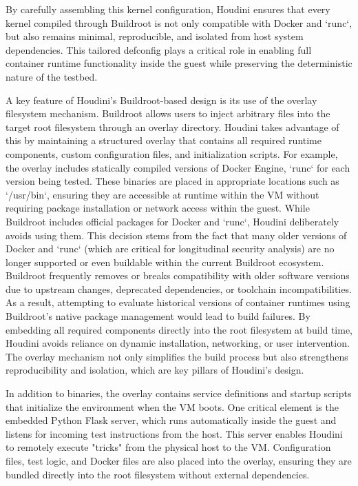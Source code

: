 \begin{doublespace}
By carefully assembling this kernel configuration, Houdini ensures that every kernel compiled through Buildroot is not only compatible with Docker and `runc`, but also remains minimal, reproducible, and isolated from host system dependencies. This tailored defconfig plays a critical role in enabling full container runtime functionality inside the guest while preserving the deterministic nature of the testbed.

A key feature of Houdini's Buildroot-based design is its use of the overlay filesystem mechanism. Buildroot allows users to inject arbitrary files into the target root filesystem through an overlay directory. Houdini takes advantage of this by maintaining a structured overlay that contains all required runtime components, custom configuration files, and initialization scripts. For example, the overlay includes statically compiled versions of Docker Engine, `runc` for each version being tested. These binaries are placed in appropriate locations such as `/usr/bin`, ensuring they are accessible at runtime within the VM without requiring package installation or network access within the guest. While Buildroot includes official packages for Docker and `runc`, Houdini deliberately avoids using them. This decision stems from the fact that many older versions of Docker and `runc` (which are critical for longitudinal security analysis) are no longer supported or even buildable within the current Buildroot ecosystem. Buildroot frequently removes or breaks compatibility with older software versions due to upstream changes, deprecated dependencies, or toolchain incompatibilities. As a result, attempting to evaluate historical versions of container runtimes using Buildroot's native package management would lead to build failures. By embedding all required components directly into the root filesystem at build time, Houdini avoids reliance on dynamic installation, networking, or user intervention. The overlay mechanism not only simplifies the build process but also strengthens reproducibility and isolation, which are key pillars of Houdini's design.

In addition to binaries, the overlay contains service definitions and startup scripts that initialize the environment when the VM boots. One critical element is the embedded Python Flask server, which runs automatically inside the guest and listens for incoming test instructions from the host. This server enables Houdini to remotely execute "tricks" from the physical host to the VM. Configuration files, test logic, and Docker files are also placed into the overlay, ensuring they are bundled directly into the root filesystem without external dependencies.


\end{doublespace}
